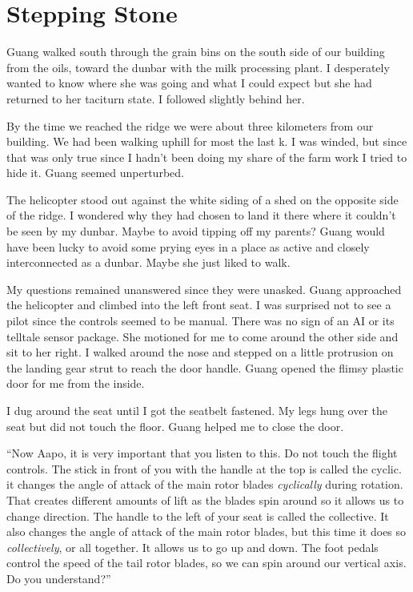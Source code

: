 %
%

\chapter{Stepping Stone}

Guang walked south through the grain bins on the south side of our building from the oils, toward the dunbar with the milk processing plant. I desperately wanted to know where she was going and what I could expect but she had returned to her taciturn state. I followed slightly behind her.

By the time we reached the ridge we were about three kilometers from our building. We had been walking uphill for most the last k. I was winded, but since that was only true since I hadn't been doing my share of the farm work I tried to hide it. Guang seemed unperturbed.

The helicopter stood out against the white siding of a shed on the opposite side of the ridge. I wondered why they had chosen to land it there where it couldn't be seen by my dunbar. Maybe to avoid tipping off my parents? Guang would have been lucky to avoid some prying eyes in a place as active and closely interconnected as a dunbar. Maybe she just liked to walk.

My questions remained unanswered since they were unasked. Guang approached the helicopter and climbed into the left front seat. I was surprised not to see a pilot since the controls seemed to be manual. There was no sign of an AI or its telltale sensor package. She motioned for me to come around the other side and sit to her right. I walked around the nose and stepped on a little protrusion on the landing gear strut to reach the door handle. Guang opened the flimsy plastic door for me from the inside.

I dug around the seat until I got the seatbelt fastened. My legs hung over the seat but did not touch the floor. Guang helped me to close the door.

``Now Aapo, it is very important that you listen to this. Do not touch the flight controls. The stick in front of you with the handle at the top is called the cyclic. it changes the angle of attack of the main rotor blades \textit{cyclically} during rotation. That creates different amounts of lift as the blades spin around so it allows us to change direction. The handle to the left of your seat is called the collective. It also changes the angle of attack of the main rotor blades, but this time it does so \textit{collectively}, or all together. It allows us to go up and down. The foot pedals control the speed of the tail rotor blades, so we can spin around our vertical axis. Do you understand?''

